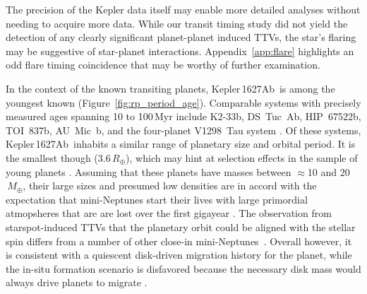 \documentclass[12pt,modern,twocolumn,tighten]{aastex63}
\newcommand{\pn}{Kepler\,1627Ab} %
\begin{document}
The precision of the Kepler data itself may enable more detailed
analyses without needing to acquire more data.  While our transit
timing study did not yield the detection of any clearly significant
planet-planet induced TTVs, the star's flaring may be suggestive of
star-planet interactions.  Appendix~\ref{app:flare} highlights an odd
flare timing coincidence that may be worthy of further examination.

In the context of the known transiting planets, \pn\ is among the
youngest known (Figure~\ref{fig:rp_period_age}).  Comparable systems
with precisely measured ages spanning 10 to 100\,Myr include K2-33b,
DS~Tuc~Ab, HIP~67522b, TOI~837b, AU~Mic~b, and the four-planet
V1298~Tau system
\citep{Mann_K2_33b_2016,David_et_al_2017,newton_tess_2019,david_four_2019,bouma_cluster_2020,plavchan_planet_2020}.
Of these systems, \pn\ inhabits a similar range of planetary size and
orbital period.  It is the smallest though ($3.6\,R_\oplus$), which
may hint at selection effects in the sample of young planets
\citep{zhou_2021_tois}.  Assuming that these planets have masses
between $\approx$10 and 20$\,M_\oplus$, their large sizes and presumed
low densities are in accord with the expectation that mini-Neptunes
start their lives with large primordial atmopsheres that are are lost
over the first gigayear
\citep{Owen_Wu_2013,Fulton_et_al_2017,ginzburg_corepowered_2018}.
The observation from starspot-induced TTVs that the planetary orbit
could be aligned with the stellar spin differs from a number of other
close-in
mini-Neptunes~\citep{sanchis-ojeda_starspots_2011,albrecht_obliquities_2012,dalal_2019_hd3167,rubenzahl_tess-keck_2021}.
Overall however, it is consistent with a quiescent disk-driven
migration history for the planet, while the in-situ formation scenario
is disfavored because the necessary disk mass would always drive
planets to migrate
\citep{inamdar_formation_2015,ogihara_reassessment_2015}.



\end{document}
